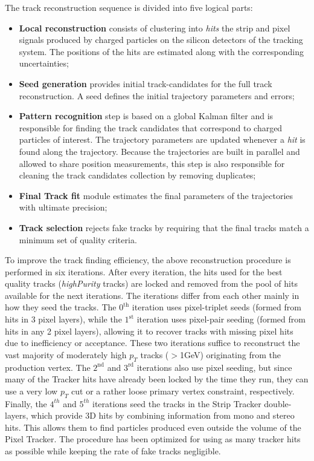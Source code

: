 The track reconstruction sequence is divided into five logical parts:
\begin{itemize}
\item \textbf{Local reconstruction} consists of clustering into \textit{hits}
the strip and pixel signals produced by charged particles on the silicon
detectors of the tracking system. The positions of the hits are estimated along
with the corresponding uncertainties;
\item \textbf{Seed generation} provides initial track-candidates for the full
track reconstruction. A seed defines the initial trajectory parameters and errors;
\item \textbf{Pattern recognition} step is based on a global Kalman filter \cite{Fruhwirth:1987fm}
 and
is responsible for finding the track candidates that correspond to charged
particles of interest. The trajectory parameters are updated whenever a \textit{hit} is found
along the trajectory. Because the trajectories are built in parallel and allowed to share position
measurements, this step is also responsible for
cleaning the track candidates collection by removing duplicates;
\item \textbf{Final Track fit} module estimates the final parameters of the trajectories
with ultimate precision;
\item \textbf{Track selection} rejects fake tracks by requiring that the final
tracks match a minimum set of quality criteria.
\end{itemize}

To improve the track finding efficiency, the above reconstruction procedure is
performed in six iterations. After every iteration, the hits
used for the best quality tracks (\textit{highPurity} tracks) are
locked and removed from the pool of hits available for the next iterations.
The iterations differ from each other mainly in how they
seed the tracks.
 The $0^\mathrm{th}$ iteration uses pixel-triplet seeds (formed from
hits in 3 pixel layers), while the $1^\mathrm{st}$ iteration uses pixel-pair seeding
(formed from hits in any 2 pixel layers), allowing it to recover tracks with
missing pixel hits due to inefficiency or acceptance. These two iterations
suffice to reconstruct the vast majority of moderately high $p_T$ tracks ($>$1GeV)
originating from the production vertex. The $2^\mathrm{nd}$ and $3^\mathrm{rd}$ iterations
also use pixel seeding, but since many of the Tracker hits have already been
locked by the time they run, they can use a very low $p_T$ cut or a rather
loose primary vertex constraint, respectively. Finally, the $4^{th}$ and $5^{th}$
iterations seed the tracks in the Strip Tracker double-layers, which provide 3D
hits by combining information from mono and stereo hits. This allows them to
find particles produced even outside the volume of the Pixel Tracker. The procedure has been optimized for using as
many tracker hits as possible while keeping the rate of fake tracks negligible.


